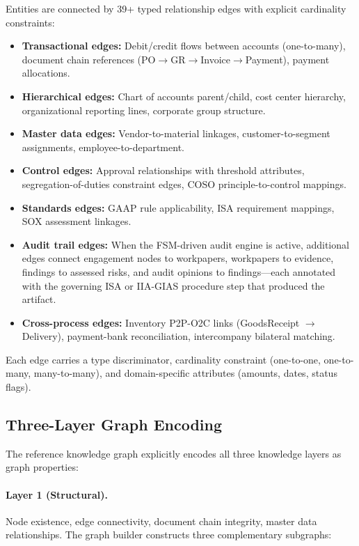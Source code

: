 Entities are connected by 39+ typed relationship edges with explicit
cardinality constraints:

\begin{itemize}
  \item \textbf{Transactional edges:} Debit/credit flows between
    accounts (one-to-many), document chain references
    (PO$\to$GR$\to$Invoice$\to$Payment), payment allocations.
  \item \textbf{Hierarchical edges:} Chart of accounts parent/child,
    cost center hierarchy, organizational reporting lines, corporate
    group structure.
  \item \textbf{Master data edges:} Vendor-to-material linkages,
    customer-to-segment assignments, employee-to-department.
  \item \textbf{Control edges:} Approval relationships with threshold
    attributes, segregation-of-duties constraint edges, COSO
    principle-to-control mappings.
  \item \textbf{Standards edges:} GAAP rule applicability, ISA
    requirement mappings, SOX assessment linkages.
  \item \textbf{Audit trail edges:} When the FSM-driven audit engine is
    active, additional edges connect engagement nodes to workpapers,
    workpapers to evidence, findings to assessed risks, and audit
    opinions to findings---each annotated with the governing ISA or
    IIA-GIAS procedure step that produced the artifact.
  \item \textbf{Cross-process edges:} Inventory P2P-O2C links
    (GoodsReceipt $\to$ Delivery), payment-bank reconciliation,
    intercompany bilateral matching.
\end{itemize}

Each edge carries a type discriminator, cardinality constraint
(one-to-one, one-to-many, many-to-many), and domain-specific attributes
(amounts, dates, status flags).

\subsection{Three-Layer Graph Encoding}
\label{sec:kg_encoding}

The reference knowledge graph explicitly encodes all three knowledge
layers as graph properties:

\paragraph{Layer 1 (Structural).}
Node existence, edge connectivity, document chain integrity, master
data relationships.  The graph builder constructs three complementary
subgraphs:

